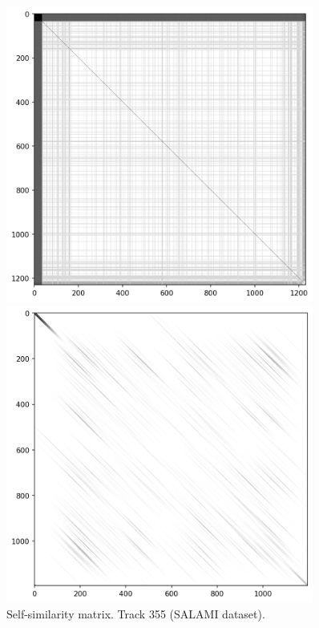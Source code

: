 \begin{figure}[ht]
    \centering
    \begin{minipage}{0.45\textwidth}
        \centering
        \includegraphics[width=0.9\textwidth]{figures/images/355recurrencematrix.png} %
        \caption[Track 355 (SALAMI dataset) Self-similarity matrix]{Self-similarity matrix. Track 355 (SALAMI dataset).}
    \end{minipage}\hfill
    \begin{minipage}{0.45\textwidth}
        \centering
        \includegraphics[width=0.9\textwidth]{figures/images/355lagmatrixgaussiansmoothing.png} %

\end{minipage}
\end{figure}
